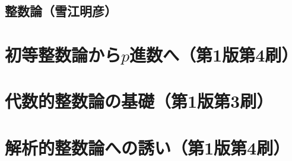 \documentclass[a4paper]{ltjsreport}
\begin{document}
\chapter*{整数論（雪江明彦）}
\printbibliography
\tableofcontents
\part{初等整数論から$p$進数へ（第1版第4刷）}

\part{代数的整数論の基礎（第1版第3刷）}



\part{解析的整数論への誘い（第1版第4刷）}

\end{document}
